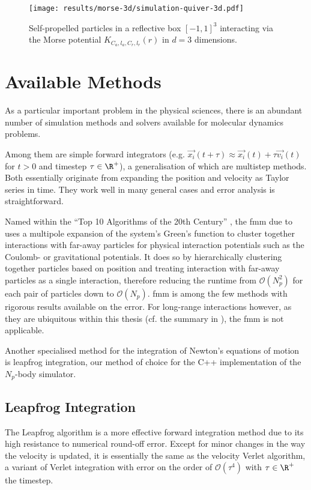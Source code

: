 \begin{figure}[H]
  \centering
  \texttt{[image: results/morse-3d/simulation-quiver-3d.pdf]}
  \caption[Self-propelled particles in 3D interacting through $K_{C_a, l_a, C_r, l_r}(r)$.]{Self-propelled particles in a reflective box $[-1, 1]^3$ interacting via the Morse potential $K_{C_a, l_a, C_r, l_r}(r)$ in $d=3$ dimensions.}
  \label{fig:morse-3d-quiver}
\end{figure}

\section{Available Methods}
As a particular important problem in the physical sciences, there is an abundant number of simulation methods and solvers available for molecular dynamics problems.

Among them are simple forward integrators (e.g. $\vec{x_i}(t + \tau) \approx \vec{x_i}(t) + \tau \vec{v_i}(t)$ for $t > 0$ and timestep $\tau \in \R^+$), a generalisation of which are multistep methods.
Both essentially originate from expanding the position and velocity as Taylor series in time.
They work well in many general cases and error analysis is straightforward.

Named within the ``Top 10 Algorithms of the 20th Century'' \parencite{2000-top-algorithms}, the \gls{fmm} due to \cite{1987-multipole-method} uses a multipole expansion of the system's Green's function to cluster together interactions with far-away particles for physical interaction potentials such as the Coulomb- or gravitational potentials.
It does so by hierarchically clustering together particles based on position and treating interaction with far-away particles as a single interaction, therefore reducing the runtime from $\mathcal{O}(N_p^2)$ for each pair of particles down to $\mathcal{O}(N_p)$.
\gls{fmm} is among the few methods with rigorous results available on the error.
For long-range interactions however, as they are ubiquitous within this thesis (cf. the summary in ), the \gls{fmm} is not applicable.

Another specialised method for the integration of Newton's equations of motion is leapfrog integration, our method of choice for the C++ implementation of the $N_p$-body simulator.

\subsection{Leapfrog Integration}
The Leapfrog algorithm is a more effective forward integration method due to its high resistance to numerical round-off error.
Except for minor changes in the way the velocity is updated, it is essentially the same as the velocity Verlet algorithm, a variant of Verlet integration with error on the order of $\mathcal{O}(\tau^4)$ with $\tau \in \R^+$ the timestep.

